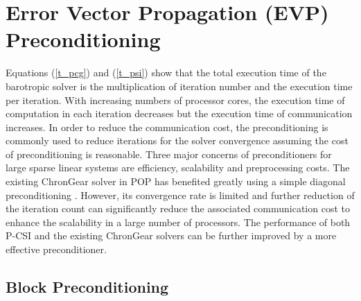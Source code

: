 \section{Error Vector Propagation (EVP) Preconditioning} \label{se:evp}
Equations (\ref{t_pcg}) and (\ref{t_psi}) show that the total execution time of the barotropic solver is the multiplication of
iteration number and the execution time per iteration.
With increasing numbers of processor cores, the execution time of computation in each iteration decreases
but the execution time of communication increases.
In order to reduce the communication cost, the preconditioning is commonly used to reduce iterations for the solver convergence
assuming the cost of preconditioning is reasonable.
Three major concerns of preconditioners for large sparse linear systems are efficiency, scalability and preprocessing costs. 
The existing ChronGear solver in POP has benefited greatly using a simple diagonal preconditioning \cite{pini1990simple, reddy2013comparison}. 
However, its convergence rate is limited and further reduction of the iteration count can significantly reduce the associated communication cost
to enhance the scalability in a large number of processors. 
The performance of both P-CSI and the existing ChronGear solvers can be further improved by a more effective preconditioner.



\subsection{Block Preconditioning}

